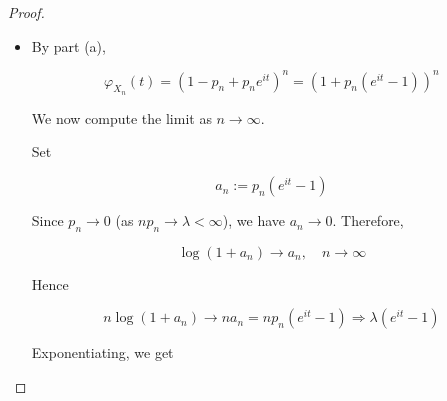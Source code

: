 \begin{proof}
\begin{itemize}
  Hence

  \[\mathit{\varphi}_{\mathit{Y}}(\mathit{t}) = \mathbb{E}\lbrack\mathit{e}^{\mathit{i}\mathit{t}\mathit{Y}}\rbrack = \sum\limits_{\mathit{k} = 0}^{\infty}\mathit{e}^{\mathit{i}\mathit{t}\mathit{k}}\mathit{e}^{- \mathit{\lambda}}\frac{\mathit{\lambda}^{\mathit{k}}}{\mathit{k}!}\]

  Thus

  \[\mathit{\varphi}_{\mathit{Y}}(\mathit{t}) = \mathit{e}^{- \mathit{\lambda}}\sum\limits_{\mathit{k} = 0}^{\infty}\frac{(\mathit{\lambda}\mathit{e}^{\mathit{i}\mathit{t}})^{\mathit{k}}}{\mathit{k}!} = \mathit{e}^{- \mathit{\lambda}}\mathit{e}^{\mathit{\lambda}\mathit{e}^{\mathit{i}\mathit{t}}} = \mathit{e}^{\mathit{\lambda}(\mathit{e}^{\mathit{i}\mathit{t}} - 1)}\]

  So the characteristic functions are

  \[\mathit{\varphi}_{\mathit{X}}(\mathit{t}) = (1 - \mathit{p} + \mathit{p}\mathit{e}^{\mathit{i}\mathit{t}})^{\mathit{n}},\quad\mathit{\varphi}_{\mathit{Y}}(\mathit{t}) = \mathit{e}^{\mathit{\lambda}(\mathit{e}^{\mathit{i}\mathit{t}} - 1)}\]
\item
  By part (a),

  \[\mathit{\varphi}_{\mathit{X}_{\mathit{n}}}(\mathit{t}) = (1 - \mathit{p}_{\mathit{n}} + \mathit{p}_{\mathit{n}}\mathit{e}^{\mathit{i}\mathit{t}})^{\mathit{n}} = \left( {1 + \mathit{p}_{\mathit{n}}(\mathit{e}^{\mathit{i}\mathit{t}} - 1)} \right)^{\mathit{n}}\]

  We now compute the limit as \(\mathit{n}\rightarrow\infty\).

  Set

  \[\mathit{a}_{\mathit{n}} := \mathit{p}_{\mathit{n}}(\mathit{e}^{\mathit{i}\mathit{t}} - 1)\]

  Since \(\mathit{p}_{\mathit{n}}\rightarrow 0\) (as \(\mathit{n}\mathit{p}_{\mathit{n}}\rightarrow\mathit{\lambda} < \infty\)), we have \(\mathit{a}_{\mathit{n}}\rightarrow 0\). Therefore,

  \[\log(1 + \mathit{a}_{\mathit{n}})\rightarrow\mathit{a}_{\mathit{n}},\quad\mathit{n}\rightarrow\infty\]

  Hence

  \[\mathit{n}\log(1 + \mathit{a}_{\mathit{n}})\rightarrow\mathit{n}\mathit{a}_{\mathit{n}} = \mathit{n}\mathit{p}_{\mathit{n}}(\mathit{e}^{\mathit{i}\mathit{t}} - 1)\Longrightarrow\mathit{\lambda}(\mathit{e}^{\mathit{i}\mathit{t}} - 1)\]

  Exponentiating, we get


\end{itemize}
\end{proof}
